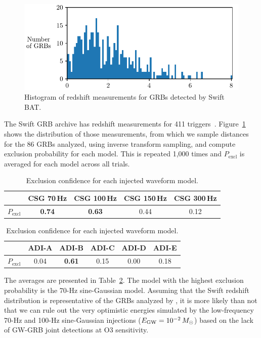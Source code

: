 \begin{figure}[h]
  \centering
  \includegraphics{figures/grb/redshifts.pdf}
  \caption{Histogram of redshift measurements for GRBs detected by Swift BAT.}
  \label{fig:grb-o3b-redshifts}
\end{figure}

The Swift GRB archive has redshift measurements for 411 triggers~\cite{swift_archive}.
Figure~\ref{fig:grb-o3b-redshifts} shows the distribution of those measurements, from which we sample distances for the 86 GRBs analyzed, using inverse transform sampling, and compute exclusion probability for each model.
This is repeated 1,000 times and $P_{\text{excl}}$ is averaged for each model across all trials.

\begin{table}[h]
  \hspace{0.5cm}
  \caption
  {\label{tab:grb-o3b-model-exclusion} Exclusion confidence for each injected waveform model.}
  \begin{tabular}{c c c c c}
    \hline
    \hline
    \rule{0pt}{4ex}
    & CSG 70\,Hz & CSG 100\,Hz & CSG 150\,Hz & CSG 300\,Hz \\
    \hline
    \rule[-2ex]{0pt}{4ex}
		$P_{\text{excl}}$ & \textbf{0.74} & \textbf{0.63} & 0.44 & 0.12
  \end{tabular}
  \begin{tabular}{c c c c c c}
    \hline
    \hline
    \rule{0pt}{4ex}
    & ADI-A & ADI-B & ADI-C & ADI-D & ADI-E \\
    \hline
    \rule[-2ex]{0pt}{4ex}
    $P_{\text{excl}}$ & 0.04 & \textbf{0.61} & 0.15 & 0.00 & 0.18 \\
    \hline
  \end{tabular}
\end{table}

The averages are presented in Table~\ref{tab:grb-o3b-model-exclusion}.
The model with the highest exclusion probability is the 70-Hz sine-Gaussian model.
Assuming that the Swift redshift distribution is representative of the GRBs analyzed by \xpip, it is more likely than not that we can rule out the very optimistic energies simulated by the low-frequency 70-Hz and 100-Hz sine-Gaussian injections ($E_{\text{GW}} = 10^{-2}\,M_{\odot}$) based on the lack of GW-GRB joint detections at O3 sensitivity.

